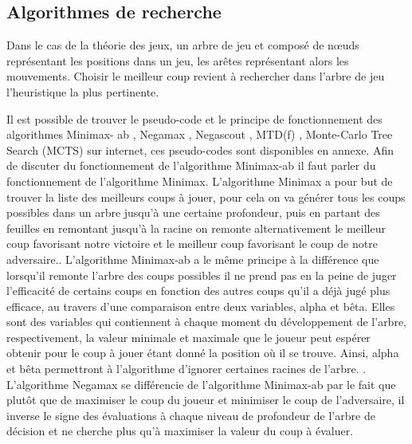 \documentclass{article}
\begin{document}
\subsection{Algorithmes de recherche}

Dans le cas de la théorie des jeux, un arbre de jeu et composé de nœuds représentant les positions dans un jeu, les arêtes représentant alors les mouvements. Choisir le meilleur coup revient à rechercher dans l'arbre de jeu l'heuristique la plus pertinente.

Il est possible de trouver le pseudo-code et le principe de fonctionnement des algorithmes Minimax-
ab \cite{Minmax-ab}, Negamax \cite{Negamax}, Negascout \cite{Negascout}, MTD(f) \cite{MTD(f)}, Monte-Carlo Tree Search (MCTS)\cite{MCTS} sur internet, ces pseudo-codes sont disponibles en annexe.
\newline
Afin de discuter du fonctionnement de l'algorithme Minimax-ab il faut parler du fonctionnement de l'algorithme Minimax.
\newline
L'algorithme Minimax a pour but de trouver la liste des meilleurs coups à jouer, pour cela on va générer tous les coups possibles dans un arbre jusqu'à une certaine profondeur,  puis en partant des feuilles en remontant jusqu'à la racine on remonte alternativement le meilleur coup favorisant notre victoire et le meilleur coup favorisant le coup de notre adversaire.\cite{Heuristiques}.
\newline\newline
L'algorithme Minimax-ab a le même principe à la différence que lorsqu'il remonte l'arbre des coups possibles il ne prend pas en la peine de juger l'efficacité de certains coups en fonction des autres coups qu'il a déjà jugé plus efficace, au travers d'une comparaison entre deux variables, alpha et bêta. Elles sont des variables qui contiennent à chaque moment du développement de l'arbre, respectivement, la valeur minimale et maximale que le joueur peut espérer obtenir pour le coup à jouer étant donné la position où il se trouve. Ainsi, alpha et bêta permettront à l'algorithme d'ignorer certaines racines de l'arbre. \cite{Heuristiques}.
\newline\newline
L'algorithme Negamax se différencie de l'algorithme Minimax-ab par le fait que plutôt que de maximiser le coup du joueur et minimiser le coup de l'adversaire, il inverse le signe des évaluations à chaque niveau de profondeur de l'arbre de décision et ne cherche plus qu'à maximiser la valeur du coup à évaluer\cite{Negamax}.
\end{document}

